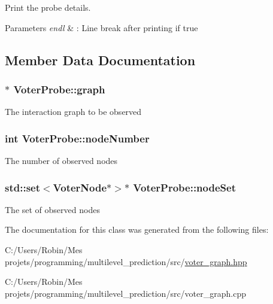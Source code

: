 Print the probe details. 


\begin{DoxyParams}{Parameters}
{\em endl} & \+: Line break after printing if true \\
\hline
\end{DoxyParams}


\subsection{Member Data Documentation}
\hypertarget{class_voter_probe_add099ac2ac20a5f6a0e3616e78639497}{}
\subsubsection[{graph}]{$\ast$ Voter\+Probe\+::graph}\label{class_voter_probe_add099ac2ac20a5f6a0e3616e78639497}
The interaction graph to be observed \hypertarget{class_voter_probe_af0a20a6fc8a68f3ace3384cbbd6aa39f}{}
\subsubsection[{node\+Number}]{\setlength{\rightskip}{0pt plus 5cm}int Voter\+Probe\+::node\+Number}\label{class_voter_probe_af0a20a6fc8a68f3ace3384cbbd6aa39f}
The number of observed nodes \hypertarget{class_voter_probe_ae51e09098a03f3e064c8a1a8182a2eeb}{}
\subsubsection[{node\+Set}]{\setlength{\rightskip}{0pt plus 5cm}std\+::set$<${\bf Voter\+Node}$\ast$$>$$\ast$ Voter\+Probe\+::node\+Set}\label{class_voter_probe_ae51e09098a03f3e064c8a1a8182a2eeb}
The set of observed nodes 

The documentation for this class was generated from the following files\+:\begin{DoxyCompactItemize}
\item 
C\+:/\+Users/\+Robin/\+Mes projets/programming/multilevel\+\_\+prediction/src/\hyperlink{voter__graph_8hpp}{voter\+\_\+graph.\+hpp}\item 
C\+:/\+Users/\+Robin/\+Mes projets/programming/multilevel\+\_\+prediction/src/voter\+\_\+graph.\+cpp\end{DoxyCompactItemize}
